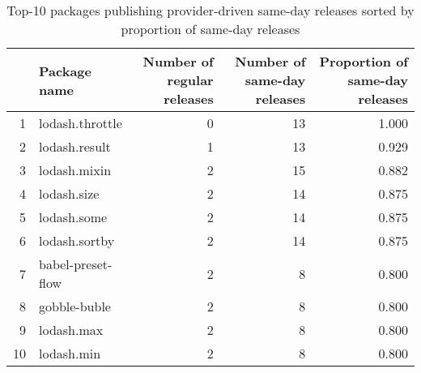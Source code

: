 \documentclass[11pt, oneside]{article}   	%
\begin{document}
\begin{table}[ht]
\centering
\begin{tabular}{rlrrr}
  \hline
 & \pbox{20cm}{Package \\name} & \pbox{20cm}{Number of \\regular releases} & \pbox{20cm}{Number of \\same-day releases} & \pbox{20cm}{Proportion of \\same-day releases} \\ 
  \hline
1 & lodash.throttle & 0 & 13 & 1.000 \\ 
  2 & lodash.result & 1 & 13 & 0.929 \\ 
  3 & lodash.mixin & 2 & 15 & 0.882 \\ 
  4 & lodash.size & 2 & 14 & 0.875 \\ 
  5 & lodash.some & 2 & 14 & 0.875 \\ 
  6 & lodash.sortby & 2 & 14 & 0.875 \\ 
  7 & babel-preset-flow & 2 & 8 & 0.800 \\ 
  8 & gobble-buble & 2 & 8 & 0.800 \\ 
  9 & lodash.max & 2 & 8 & 0.800 \\ 
  10 & lodash.min & 2 & 8 & 0.800 \\ 
   \hline
\end{tabular}
\caption{Top-10 packages publishing provider-driven same-day releases sorted by proportion of same-day releases} 
\end{table}
\end{document}
